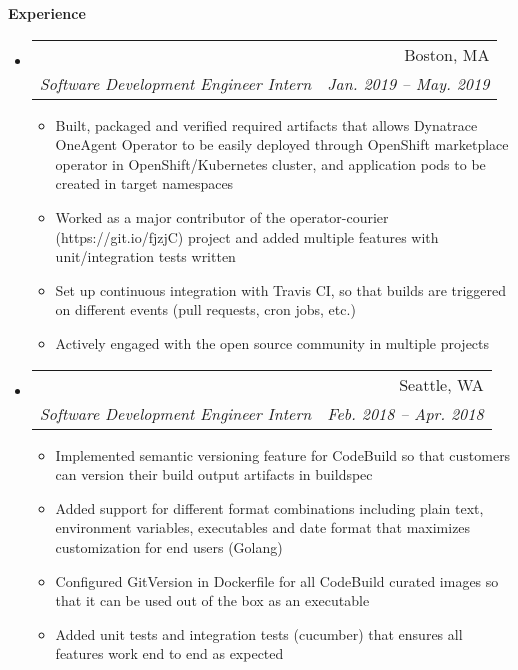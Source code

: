\documentclass{article}
\makeatletter
\newcommand{\resitem}[1]{
    \item #1
    \vspace{-2pt}
}
\newcommand{\resheading}[1]{{\large \colorbox{mygrey}{\begin{minipage}{\textwidth}{\textbf{#1 \vphantom{p\^{E}}}}\end{minipage}}}}
\newcommand{\ressubheading}[4]{
\begin{tabular*}{6.80in}{l@{\extracolsep{\fill}}r}
    \textbf{#1} & #2 \\
    \textit{#3} & \textit{#4} \\
\end{tabular*}\vspace{-6pt}}
\makeatother
\begin{document}

    \resheading{Experience}

    \begin{itemize}
        \item
        \ressubheading
        {\href
            {https://operatorhub.io/}
            {Red Hat OpenShift - OperatorHub.io}
        }
        {Boston, MA}
        {Software Development Engineer Intern}
        {Jan. 2019 -- May. 2019}
        {\footnotesize
        \begin{itemize} %
            \resitem
            {Built, packaged and verified required artifacts that allows Dynatrace OneAgent Operator
            to be easily deployed through OpenShift marketplace operator in OpenShift/Kubernetes cluster,
            and application pods to be created in target namespaces}
            \resitem
            {Worked as a major contributor of the
                operator-courier (https://git.io/fjzjC)
            project and added multiple features with unit/integration tests written}
            \resitem
            {Set up continuous integration with Travis CI, so that builds are triggered
            on different events (pull requests, cron jobs, etc.)}
            \resitem
            {Actively engaged with the open source community in multiple projects}
        \end{itemize}
        }

        \item
        \ressubheading
        {\href
            {https://aws.amazon.com/codebuild/}
            {Amazon Web Services - AWS CodeBuild}
        }
        {Seattle, WA}
        {Software Development Engineer Intern}
        {Feb. 2018 -- Apr. 2018}
        {\footnotesize
        \begin{itemize} %
            \resitem
            {Implemented semantic versioning feature for CodeBuild so that
             customers can version their build output artifacts in buildspec}
            \resitem
            {Added support for different format combinations including plain text, environment variables,
            executables and date format that maximizes customization for end users (Golang)}
            \resitem
            {Configured GitVersion in Dockerfile for all CodeBuild curated images so that
            it can be used out of the box as an executable}
            \resitem
            {Added unit tests and integration tests (cucumber) that ensures all features work end to end as expected}
        \end{itemize}
        }


\end{itemize}
\end{document}
